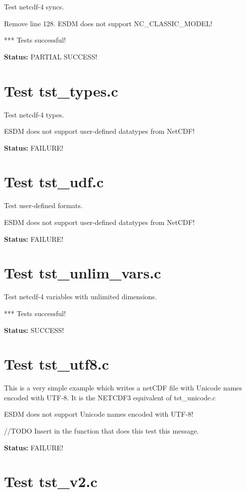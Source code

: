 Test netcdf-4 syncs.

Remove line 128. ESDM does not support NC\_CLASSIC\_MODEL!

*** Tests successful!

{\bf \large Status: } PARTIAL SUCCESS!

\section{Test tst\_types.c}

Test netcdf-4 types.

ESDM does not support user-defined datatypes from NetCDF!

{\bf \large Status: } FAILURE!

\section{Test tst\_udf.c}

Test user-defined formats.

ESDM does not support user-defined datatypes from NetCDF!

{\bf \large Status: } FAILURE!

\section{Test tst\_unlim\_vars.c}

Test netcdf-4 variables with unlimited dimensions.

*** Tests successful!

{\bf \large Status: } SUCCESS!

\section{Test tst\_utf8.c}

This is a very simple example which writes a netCDF file with Unicode names encoded with UTF-8. It is the NETCDF3 equivalent of tst\_unicode.c

ESDM does not support Unicode names encoded with UTF-8!

//TODO Insert in the function that does this test this message.

{\bf \large Status: } FAILURE!

\section{Test tst\_v2.c}

